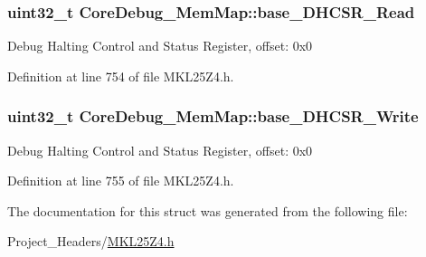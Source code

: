 \subsubsection[{\texorpdfstring{base\+\_\+\+D\+H\+C\+S\+R\+\_\+\+Read}{base_DHCSR_Read}}]{\setlength{\rightskip}{0pt plus 5cm}uint32\+\_\+t Core\+Debug\+\_\+\+Mem\+Map\+::base\+\_\+\+D\+H\+C\+S\+R\+\_\+\+Read}\hypertarget{struct_core_debug___mem_map_a4968901505f61e2a98c9196a8ac7584b}{}\label{struct_core_debug___mem_map_a4968901505f61e2a98c9196a8ac7584b}
Debug Halting Control and Status Register, offset\+: 0x0 

Definition at line 754 of file M\+K\+L25\+Z4.\+h.

\subsubsection[{\texorpdfstring{base\+\_\+\+D\+H\+C\+S\+R\+\_\+\+Write}{base_DHCSR_Write}}]{\setlength{\rightskip}{0pt plus 5cm}uint32\+\_\+t Core\+Debug\+\_\+\+Mem\+Map\+::base\+\_\+\+D\+H\+C\+S\+R\+\_\+\+Write}\hypertarget{struct_core_debug___mem_map_a57de52c8c1eb5789546543f2408ce487}{}\label{struct_core_debug___mem_map_a57de52c8c1eb5789546543f2408ce487}
Debug Halting Control and Status Register, offset\+: 0x0 

Definition at line 755 of file M\+K\+L25\+Z4.\+h.



The documentation for this struct was generated from the following file\+:\begin{DoxyCompactItemize}
\item 
Project\+\_\+\+Headers/\hyperlink{_m_k_l25_z4_8h}{M\+K\+L25\+Z4.\+h}\end{DoxyCompactItemize}
